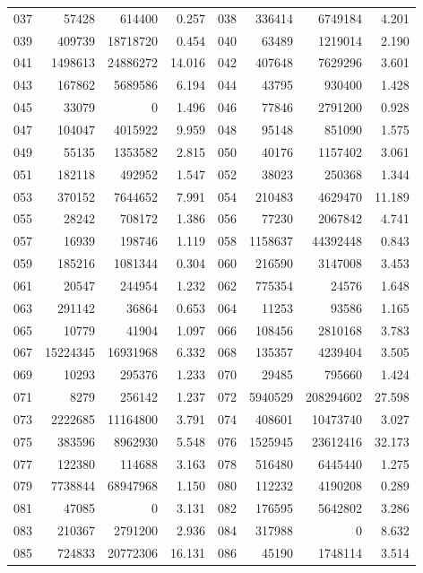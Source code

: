 \begin{longtable}{lrrr@{\hspace{16bp}}lrrr}
037 & 57428 & 614400 & 0.257 & 038 & 336414 & 6749184 & 4.201\\
039 & 409739 & 18718720 & 0.454 & 040 & 63489 & 1219014 & 2.190\\
041 & 1498613 & 24886272 & 14.016 & 042 & 407648 & 7629296 & 3.601\\
043 & 167862 & 5689586 & 6.194 & 044 & 43795 & 930400 & 1.428\\
045 & 33079 & 0 & 1.496 & 046 & 77846 & 2791200 & 0.928\\
047 & 104047 & 4015922 & 9.959 & 048 & 95148 & 851090 & 1.575\\
049 & 55135 & 1353582 & 2.815 & 050 & 40176 & 1157402 & 3.061\\
051 & 182118 & 492952 & 1.547 & 052 & 38023 & 250368 & 1.344\\
053 & 370152 & 7644652 & 7.991 & 054 & 210483 & 4629470 & 11.189\\
055 & 28242 & 708172 & 1.386 & 056 & 77230 & 2067842 & 4.741\\
057 & 16939 & 198746 & 1.119 & 058 & 1158637 & 44392448 & 0.843\\
059 & 185216 & 1081344 & 0.304 & 060 & 216590 & 3147008 & 3.453\\
061 & 20547 & 244954 & 1.232 & 062 & 775354 & 24576 & 1.648\\
063 & 291142 & 36864 & 0.653 & 064 & 11253 & 93586 & 1.165\\
065 & 10779 & 41904 & 1.097 & 066 & 108456 & 2810168 & 3.783\\
067 & 15224345 & 16931968 & 6.332 & 068 & 135357 & 4239404 & 3.505\\
069 & 10293 & 295376 & 1.233 & 070 & 29485 & 795660 & 1.424\\
071 & 8279 & 256142 & 1.237 & 072 & 5940529 & 208294602 & 27.598\\
073 & 2222685 & 11164800 & 3.791 & 074 & 408601 & 10473740 & 3.027\\
075 & 383596 & 8962930 & 5.548 & 076 & 1525945 & 23612416 & 32.173\\
077 & 122380 & 114688 & 3.163 & 078 & 516480 & 6445440 & 1.275\\
079 & 7738844 & 68947968 & 1.150 & 080 & 112232 & 4190208 & 0.289\\
081 & 47085 & 0 & 3.131 & 082 & 176595 & 5642802 & 3.286\\
083 & 210367 & 2791200 & 2.936 & 084 & 317988 & 0 & 8.632\\
085 & 724833 & 20772306 & 16.131 & 086 & 45190 & 1748114 & 3.514\\

\end{longtable}
